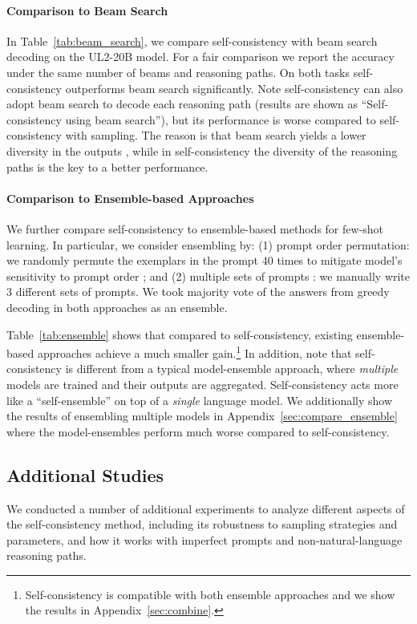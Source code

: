 \paragraph{Comparison to Beam Search} In Table~\ref{tab:beam_search}, we compare self-consistency with beam search decoding on the UL2-20B model. For a fair comparison we report the accuracy under the same number of beams and reasoning paths. On both tasks self-consistency outperforms beam search significantly. Note self-consistency can also adopt beam search to decode each reasoning path (results are shown as ``Self-consistency using beam search''), but its performance is worse compared to self-consistency with sampling. The reason is that beam search yields a lower diversity in the outputs  \citep{https://doi.org/10.48550/arxiv.1601.00372}, while in self-consistency the diversity of the reasoning paths is the key to a better performance.

\paragraph{Comparison to Ensemble-based Approaches} We further compare self-consistency to ensemble-based methods for few-shot learning. In particular, we consider ensembling by: (1) prompt order permutation: we randomly permute the exemplars in the prompt 40 times to mitigate model's sensitivity to prompt order \citep{pmlr-v139-zhao21c,Lu2021FantasticallyOP}; and (2) multiple sets of prompts \citep{gao-etal-2021-making}: we manually write $3$ different sets of prompts. We took majority vote of the answers from greedy decoding in both approaches as an ensemble.

Table~\ref{tab:ensemble} shows that compared to self-consistency, existing ensemble-based approaches achieve a much smaller gain.\footnote{Self-consistency is compatible with both ensemble approaches and we show the results in Appendix~\ref{sec:combine}.}
In addition, note that self-consistency is different from a typical model-ensemble approach, where \textit{multiple} models are trained and their outputs are aggregated. Self-consistency acts more like a ``self-ensemble'' on top of a \textit{single} language model. We additionally show the results of ensembling multiple models in Appendix~\ref{sec:compare_ensemble} where the model-ensembles perform much worse compared to self-consistency.

\subsection{Additional Studies}
\label{sec:ablation_sampling}
We conducted a number of additional experiments to analyze different aspects of the self-consistency method, including its robustness to sampling strategies and parameters, and how it works with imperfect prompts and  non-natural-language reasoning paths.

